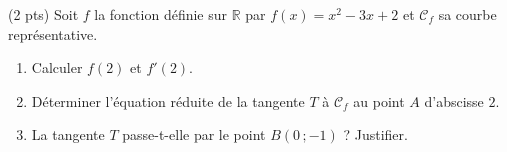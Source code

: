 \documentclass[11pt]{article}
\begin{document}
\begin{exercice} \hfill (2 pts)
Soit $f$ la fonction définie sur $\mathbb{R}$ par $f(x)=x^2-3x+2$ et $\mathcal{C}_f$ sa courbe représentative.
\begin{enumerate}
\item Calculer $f(2)$ et $f'(2)$.
\item Déterminer l'équation réduite de la tangente $T$ à $\mathcal{C}_f$ au point $A$ d'abscisse $2$.
\item La tangente $T$ passe-t-elle par le point $B(0\,;-1)$ ? Justifier.
\end{enumerate}
\end{exercice}
\end{document}
